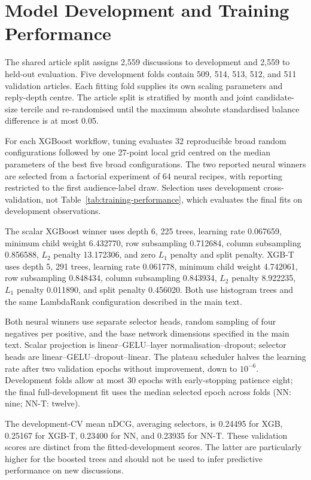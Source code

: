 \section{Model Development and Training Performance}
\label{app:development}
The shared article split assigns 2,559 discussions to development and 2,559 to held-out evaluation. Five development folds contain 509, 514, 513, 512, and 511 validation articles. Each fitting fold supplies its own scaling parameters and reply-depth centre. The article split is stratified by month and joint candidate-size tercile and re-randomised until the maximum absolute standardised balance difference is at most 0.05.

For each XGBoost workflow, tuning evaluates 32 reproducible broad random configurations followed by one 27-point local grid centred on the median parameters of the best five broad configurations. The two reported neural winners are selected from a factorial experiment of 64 neural recipes, with reporting restricted to the first audience-label draw. Selection uses development cross-validation, not Table~\ref{tab:training-performance}, which evaluates the final fits on development observations.

The scalar XGBoost winner uses depth 6, 225 trees, learning rate 0.067659, minimum child weight 6.432770, row subsampling 0.712684, column subsampling 0.856588, $L_2$ penalty 13.172306, and zero $L_1$ penalty and split penalty. XGB-T uses depth 5, 291 trees, learning rate 0.061778, minimum child weight 4.742061, row subsampling 0.848434, column subsampling 0.843934, $L_2$ penalty 8.922235, $L_1$ penalty 0.011890, and split penalty 0.456020. Both use histogram trees and the same LambdaRank configuration described in the main text.

Both neural winners use separate selector heads, random sampling of four negatives per positive, and the base network dimensions specified in the main text. Scalar projection is linear--GELU--layer normalisation--dropout; selector heads are linear--GELU--dropout--linear. The plateau scheduler halves the learning rate after two validation epochs without improvement, down to $10^{-6}$. Development folds allow at most 30 epochs with early-stopping patience eight; the final full-development fit uses the median selected epoch across folds (NN: nine; NN-T: twelve).

The development-CV mean nDCG, averaging selectors, is 0.24495 for XGB, 0.25167 for XGB-T, 0.23400 for NN, and 0.23935 for NN-T. These validation scores are distinct from the fitted-development scores. The latter are particularly higher for the boosted trees and should not be used to infer predictive performance on new discussions.

